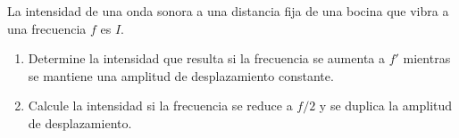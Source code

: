 \item La intensidad de una onda sonora a una distancia fija de una bocina que vibra a una frecuencia $f$ es $I$.
\begin{enumerate}
    \item Determine la intensidad que resulta si la frecuencia se aumenta a $f'$ mientras se mantiene una amplitud de desplazamiento constante.
    \item Calcule la intensidad si la frecuencia se reduce a $f/2$ y se duplica la amplitud de desplazamiento.
\end{enumerate}